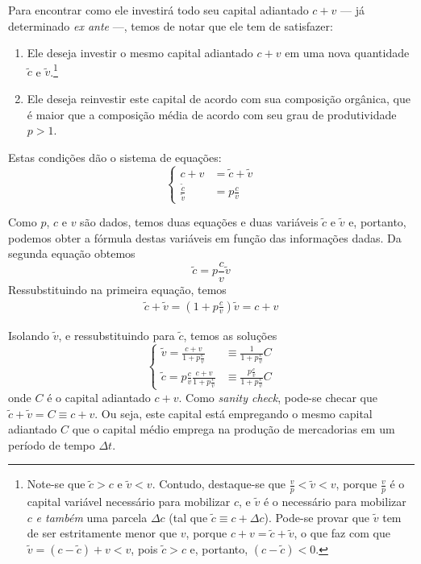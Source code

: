\documentclass[12pt]{article}
\numberwithin{equation}{section}
\theoremstyle{plain}
\theoremstyle{definition}
\theoremstyle{remark}
\begin{document}
Para encontrar como ele investirá todo seu capital adiantado $c+v$ — já determinado \textit{ex ante} —, temos de notar que ele tem de satisfazer:
\begin{enumerate}
\item Ele deseja investir o mesmo capital adiantado $c+v$ em uma nova quantidade $\tilde{c}$ e $\tilde{v}$.\footnote{Note-se que $\tilde{c}>c$ e $\tilde{v}<v$. Contudo, destaque-se que $\frac{v}{p}< \tilde{v} < v$, porque $\frac{v}{p}$ é o capital variável necessário para mobilizar $c$, e $\tilde{v}$ é o necessário para mobilizar $c$ \textit{e também} uma parcela $\Delta c$ (tal que $\tilde{c} \equiv c + \Delta c$). Pode-se provar que $\tilde{v}$ tem de ser estritamente menor que $v$, porque $c+v=\tilde{c}+\tilde{v}$, o que faz com que $\tilde{v}= (c-\tilde{c})+v<v$, pois $\tilde{c}>c$ e, portanto, $(c-\tilde{c})<0$.  } 
\item Ele deseja reinvestir este capital de acordo com sua composição orgânica, que é maior que a composição média de acordo com seu grau de produtividade $p>1$. 
\end{enumerate}

Estas condições dão o sistema de equações:
$$
\begin{cases}
c+v&=\tilde{c}+\tilde{v} \\
\frac{\tilde{c}}{\tilde{v}} &= p \frac{c}{v}
\end{cases}
$$

Como $p$, $c$ e $v$ são dados, temos duas equações e duas variáveis $\tilde{c}$ e $\tilde{v}$ e, portanto, podemos obter a fórmula destas variáveis em função das informações dadas. Da segunda equação obtemos
$$
\tilde{c} = p \frac{c}{v} \tilde{v}
$$
Ressubstituindo na primeira equação, temos
\begin{align*}
\tilde{c}+\tilde{v} = \left( 1+p \frac{c}{v} \right) \tilde{v} = c+v
\end{align*}

Isolando $\tilde{v}$, e ressubstituindo para $\tilde{c}$, temos as soluções
$$
\begin{cases}
\tilde{v} = \frac{c+v}{1+p \frac{c}{v}} &\equiv \frac{1}{1+p \frac{c}{v}} C \\
\tilde{c} = p \frac{c}{v} \frac{c+v}{1+p \frac{c}{v}} &\equiv \frac{p \frac{c}{v}}{1+p \frac{c}{v}} C
\end{cases}
$$
onde $C$ é o capital adiantado $c+v$. Como \textit{sanity check}, pode-se checar que $\tilde{c}+\tilde{v} = C \equiv c+v$. Ou seja, este capital está empregando o mesmo capital adiantado $C$ que o capital médio emprega na produção de mercadorias em um período de tempo $\Delta t$.
\end{document}
